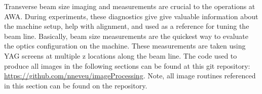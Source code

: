  \label{sec:beamsize}

Transverse beam size imaging and measurements are crucial to the 
operations at AWA. During experiments, these diagnostics give 
give valuable information about the machine setup, help with alignment, 
and used as a reference for tuning the beam line.
Basically, beam size measurements are the quickest way to evaluate the
optics configuration on the machine. 
These measurements are taken using YAG screens at multiple z locations along the beam line.
The code used to produce all images in the following sections can be found at this git repository: 
\url{https://github.com/nneveu/imageProcessing}.
Note, all image routines referenced in this section can be found on the repository.


